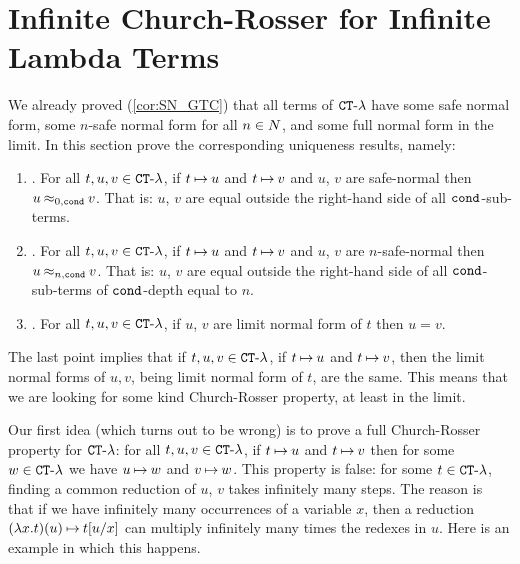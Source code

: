 

\newpage

\section{Infinite Church-Rosser for Infinite Lambda Terms}
\label{section-safe-church-rosser}

We already proved (\ref{cor:SN_GTC}) that all terms of ${ {\tt CT}\mbox{-}\lambda}$ have some
safe normal form, some $n$-safe normal form
for all $n \in {N}$, and some full normal form in the limit. 
In this section prove the corresponding uniqueness results,  namely:

\begin{enumerate}
\item
\emph{\bf{}}.
For all $t,u,v \in { {\tt CT}\mbox{-}\lambda}$, if $t \mathbin{\mapsto} u$ and $t \mathbin{\mapsto} v$ and $u$, $v$ are safe-normal 
then $u \mathbin{\approx_{0,{\tt cond}}} v$. That is: $u$, $v$ are equal outside the right-hand side of all ${\tt cond}$-sub-terms.
\item
\emph{\bf{}}.
For all $t,u,v \in { {\tt CT}\mbox{-}\lambda}$, if $t \mathbin{\mapsto} u$ and $t \mathbin{\mapsto} v$ and $u$, $v$ are $n$-safe-normal 
then $u \mathbin{\approx_{n,{\tt cond}}} v$. That is: $u$, $v$ are equal outside the right-hand side of all ${\tt cond}$-sub-terms
of ${\tt cond}$-depth equal to $n$.
\item
\emph{\bf{}}.
For all $t,u,v \in { {\tt CT}\mbox{-}\lambda}$, if $u$, $v$ are limit normal form of $t$ then $u = v$.
\end{enumerate}

The last point implies that if $t,u,v \in { {\tt CT}\mbox{-}\lambda}$, if $t \mathbin{\mapsto} u$ and $t \mathbin{\mapsto} v$,
then the limit normal forms of $u,v$, being limit normal form of $t$, are the same. This means that we
are looking for some kind Church-Rosser property, at least in the limit.

Our first idea (which turns out to be wrong) 
is to prove a full Church-Rosser property for ${ {\tt CT}\mbox{-}\lambda}$: 
for all $t,u,v \in { {\tt CT}\mbox{-}\lambda}$, if $t \mathbin{\mapsto} u$ and $t \mathbin{\mapsto} v$ then for some $w \in { {\tt CT}\mbox{-}\lambda}$
we have $u \mathbin{\mapsto} w$ and $v \mathbin{\mapsto} w$. This property is false: for some $t \in { {\tt CT}\mbox{-}\lambda}$, finding a 
common reduction of $u$, $v$ takes infinitely many steps. The reason is that if we have infinitely many
occurrences of a variable $x$, then a reduction $(\lambda x.t)(u) \mathbin{\mapsto} t[u/x]$ can multiply
infinitely many times the redexes in $u$. Here is an example in which this happens.

